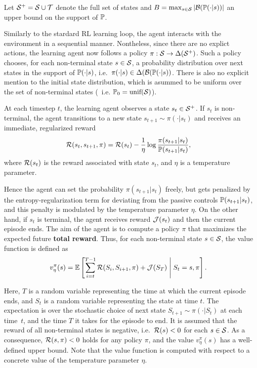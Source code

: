 \noindent Let $\mathcal{S}^+=\mathcal{S}\cup\mathcal{T}$ denote the full set of states and $B=\max_{s\in\mathcal{S}}|\mathcal{B}(\mathbb{P}(\cdot|s))|$ an upper bound on the support of $\mathbb{P}$. 

Similarly to the stardard RL learning loop, the agent interacts with the environment in a sequential manner. Nontheless, since there are no explict actions, the learning agent now follows a policy $\pi:\mathcal{S}\rightarrow\Delta(\mathcal{S}^+)$. Such a policy chooses, for each non-terminal state $s\in\mathcal{S}$, a probability distribution over next states in the support of $\mathbb{P}(\cdot|s)$, i.e.~$\pi(\cdot|s)\in\Delta(\mathcal{B}(\mathbb{P}(\cdot|s))$. There is also no explicit mention to the initial state distribution, which is asummed to be uniform over the set of non-terminal states (~i.e. $\mathbb{P}_0 = \text{unif}(\mathcal{S})$). 

At each timestep $t$, the learning agent observes a state $s_t\in\mathcal{S}^+$. If $s_t$ is non-terminal, the agent transitions to a new state $s_{t+1}\sim\pi(\cdot|s_t)$ and receives an immediate, regularized reward
\[
\mathcal{R}(s_t, s_{t+1},\pi) = \mathcal{R}(s_t) - \frac 1 \eta \log \frac {\pi(s_{t+1}|s_t)} {\mathbb{P}(s_{t+1}|s_t)},
\] 
where $\mathcal{R}(s_t)$ is the reward associated with state $s_t$, and $\eta$ is a temperature parameter. 

Hence the agent can set the probability $\pi(s_{t+1}|s_t)$ freely, but gets penalized by the entropy-regularization term for deviating from the passive controls $\mathbb{P}(s_{t+1}|s_t)$, and this penalty is modulated by the temperature parameter $\eta$. On the other hand, if $s_t$ is terminal, the agent receives reward $\mathcal{J}(s_t)$ and then the current episode ends. The aim of the agent is to compute a policy $\pi$ that maximizes the expected future \textbf{total reward}. Thus, for each non-terminal state $s\in\mathcal{S}$, the value function is defined as
\[
v^\pi_\eta(s) = \mathbb{E}\left[\sum_{i=t}^{T-1} \mathcal{R}(S_i, S_{i+1},\pi) + \mathcal{J}(S_T)\;\middle\lvert\;S_t = s, \pi\right].
\]

Here, $T$ is a random variable representing the time at which the current episode ends, and $S_t$ is a random variable representing the state at time $t$. The expectation is over the stochastic choice of next state $S_{t+1}\sim\pi(\cdot|S_t)$ at each time~$t$, and the time $T$ it takes for the episode to end. It is assumed that the reward of all non-terminal states is negative, i.e.~$\mathcal{R}(s)<0$ for each $s\in\mathcal{S}$. As a consequence, $\mathcal{R}(s,\pi)<0$ holds for any policy $\pi$, and the value $v^\pi_\eta(s)$ has a well-defined upper bound. Note that the value function is computed with respect to a concrete value of the temperature parameter $\eta$.  


